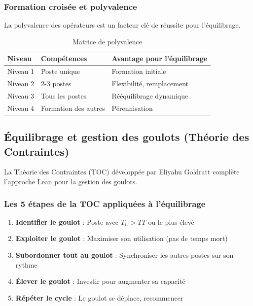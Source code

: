 \documentclass[12pt,a4paper]{article}
\begin{document}
\subsubsection{Formation croisée et polyvalence}

La polyvalence des opérateurs est un facteur clé de réussite pour l'équilibrage.

\begin{table}[H]
\centering
\begin{tabular}{|p{3cm}|p{4cm}|p{5cm}|}
\hline
\textbf{Niveau} & \textbf{Compétences} & \textbf{Avantage pour l'équilibrage} \\
\hline
Niveau 1 & Poste unique & Formation initiale \\
\hline
Niveau 2 & 2-3 postes & Flexibilité, remplacement \\
\hline
Niveau 3 & Tous les postes & Rééquilibrage dynamique \\
\hline
Niveau 4 & Formation des autres & Pérennisation \\
\hline
\end{tabular}
\caption{Matrice de polyvalence}
\end{table}

\subsection{Équilibrage et gestion des goulots (Théorie des Contraintes)}

La Théorie des Contraintes (TOC) développée par Eliyahu Goldratt complète l'approche Lean pour la gestion des goulots.

\subsubsection{Les 5 étapes de la TOC appliquées à l'équilibrage}

\begin{enumerate}
    \item \textbf{Identifier le goulot} : Poste avec $T_C > TT$ ou le plus élevé
    \item \textbf{Exploiter le goulot} : Maximiser son utilisation (pas de temps mort)
    \item \textbf{Subordonner tout au goulot} : Synchroniser les autres postes sur son rythme
    \item \textbf{Élever le goulot} : Investir pour augmenter sa capacité
    \item \textbf{Répéter le cycle} : Le goulot se déplace, recommencer
\end{enumerate}
\end{document}
